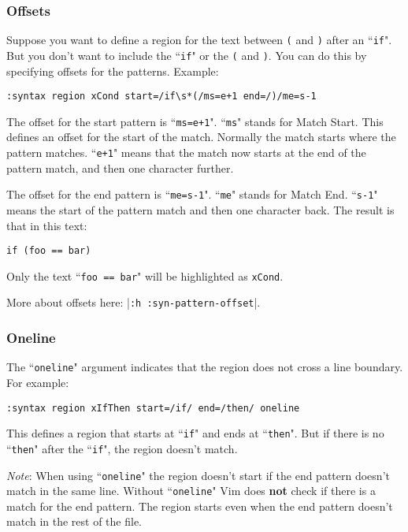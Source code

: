 \subsubsection{Offsets}
Suppose you want to define a region for the text between \texttt{(} and \texttt{)} after an ``\texttt{if}".
But you don't want to include the ``\texttt{if}" or the \texttt{(} and \texttt{)}.
You can do this by specifying offsets for the patterns.
Example:

\begin{Verbatim}[samepage=true]
 :syntax region xCond start=/if\s*(/ms=e+1 end=/)/me=s-1
\end{Verbatim}

The offset for the start pattern is ``\texttt{ms=e+1}".
``\texttt{ms}" stands for Match Start.
This defines an offset for the start of the match.
Normally the match starts where the pattern matches.
``\texttt{e+1}" means that the match now starts at the end of the pattern match, and then one character further.

The offset for the end pattern is ``\texttt{me=s-1}".
``\texttt{me}" stands for Match End.
``\texttt{s-1}" means the start of the pattern match and then one character back.
The result is that in this text:

\begin{Verbatim}[samepage=true]
    if (foo == bar)
\end{Verbatim}

Only the text ``\texttt{foo == bar}" will be highlighted as \texttt{xCond}.

More about offsets here: |\texttt{:h :syn-pattern-offset}|.
\subsubsection{Oneline}
The ``\texttt{oneline}" argument indicates that the region does not cross a line boundary.
For example:

\begin{Verbatim}[samepage=true]
 :syntax region xIfThen start=/if/ end=/then/ oneline
\end{Verbatim}

This defines a region that starts at ``\texttt{if}" and ends at ``\texttt{then}".
But if there is no ``\texttt{then}" after the ``\texttt{if}", the region doesn't match.

\emph{Note}: When using ``\texttt{oneline}" the region doesn't start if the end pattern doesn't match in the same line.
Without ``\texttt{oneline}" Vim does \textbf{not} check if there is a match for the end pattern.
The region starts even when the end pattern doesn't match in the rest of the file.

